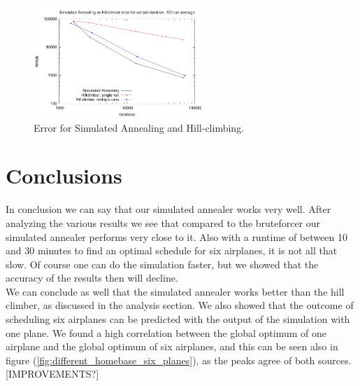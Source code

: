 \documentclass[journal]{IEEEtran}
\begin{document}
\begin{figure}[H]
\centering
\includegraphics[width=2.5in]{iterations_vs_error_sa_hc}
\caption{Error for Simulated Annealing and Hill-climbing.\tiny}
\label{fig:error_sa_hc}
\end{figure}
\section{Conclusions}
In conclusion we can say that our simulated annealer works very well. After analyzing the various results we see that compared to the bruteforcer our simulated annealer performs very close to it. Also with a runtime of between 10 and 30 minutes to find an optimal schedule for six airplanes, it is not all that slow. Of course one can do the simulation faster, but we showed that the accuracy of the results then will decline.\\ 
We can conclude as well that the simulated annealer works better than the hill climber, as discussed in the analysis section.
We also showed that the outcome of scheduling six airplanes can be predicted with the output of the simulation with one plane. We found a high correlation between the global optimum of one airplane and the global optimum of six airplanes, and this can be seen also in figure (\ref{fig:different_homebase_six_planes}), as the peaks agree of both sources. [IMPROVEMENTS?]\\



\end{document}
